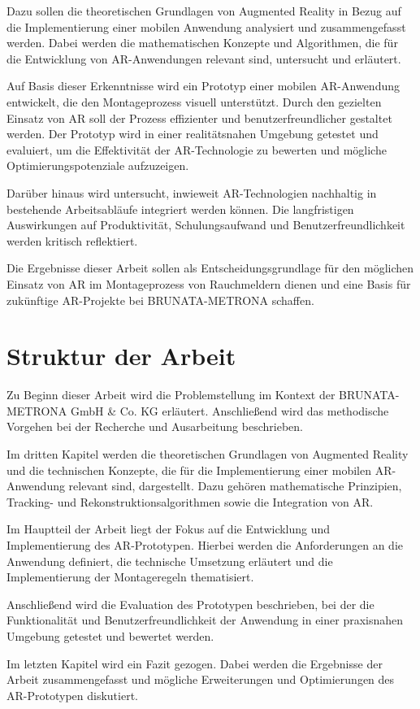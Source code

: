 Dazu sollen die theoretischen Grundlagen von Augmented Reality in Bezug auf die Implementierung einer mobilen Anwendung analysiert und zusammengefasst werden. Dabei werden die mathematischen Konzepte und Algorithmen, die für die Entwicklung von AR-Anwendungen relevant sind, untersucht und erläutert.

Auf Basis dieser Erkenntnisse wird ein Prototyp einer mobilen AR-Anwendung entwickelt, die den Montageprozess visuell unterstützt. Durch den gezielten Einsatz von AR soll der Prozess effizienter und benutzerfreundlicher gestaltet werden. Der Prototyp wird in einer realitätsnahen Umgebung getestet und evaluiert, um die Effektivität der AR-Technologie zu bewerten und mögliche Optimierungspotenziale aufzuzeigen.

Darüber hinaus wird untersucht, inwieweit AR-Technologien nachhaltig in bestehende Arbeitsabläufe integriert werden können. Die langfristigen Auswirkungen auf Produktivität, Schulungsaufwand und Benutzerfreundlichkeit werden kritisch reflektiert.

Die Ergebnisse dieser Arbeit sollen als Entscheidungsgrundlage für den möglichen Einsatz von AR im Montageprozess von Rauchmeldern dienen und eine Basis für zukünftige AR-Projekte bei BRUNATA-METRONA schaffen.

\section{Struktur der Arbeit}

Zu Beginn dieser Arbeit wird die Problemstellung im Kontext der BRUNATA-METRONA GmbH \& Co. KG erläutert. Anschließend wird das methodische Vorgehen bei der Recherche und Ausarbeitung beschrieben. 

Im dritten Kapitel werden die theoretischen Grundlagen von Augmented Reality und die technischen Konzepte, die für die Implementierung einer mobilen AR-Anwendung relevant sind, dargestellt. Dazu gehören mathematische Prinzipien, Tracking- und Rekonstruktionsalgorithmen sowie die Integration von AR.

Im Hauptteil der Arbeit liegt der Fokus auf die Entwicklung und Implementierung des AR-Prototypen. Hierbei werden die Anforderungen an die Anwendung definiert, die technische Umsetzung erläutert und die Implementierung der Montageregeln thematisiert. 

Anschließend wird die Evaluation des Prototypen beschrieben, bei der die Funktionalität und Benutzerfreundlichkeit der Anwendung in einer praxisnahen Umgebung getestet und bewertet werden.

Im letzten Kapitel wird ein Fazit gezogen. Dabei werden die Ergebnisse der Arbeit zusammengefasst und mögliche Erweiterungen und Optimierungen des AR-Prototypen diskutiert.

